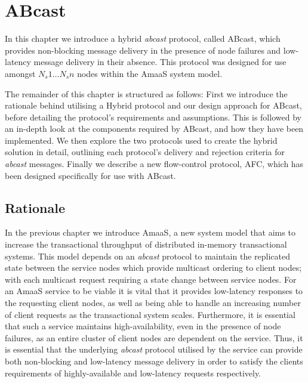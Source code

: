 \chapter{ABcast}\label{ch:abcast}

    \graphicspath{{Chapter4-ABcast/Figs/Vector/}{Chapter4-ABcast/Figs/}}

In this chapter we  introduce a hybrid \emph{abcast} protocol, called \textsf{ABcast}, which provides non-blocking message delivery in the presence of node failures and low-latency message delivery in their absence.  This protocol was designed for use amongst $N_s1 \ldots N_sn$ nodes within the \textsf{AmaaS} system model.  

The remainder of this chapter is structured as follows:  First we introduce the rationale behind utilising a Hybrid protocol and our design approach for \textsf{ABcast}, before detailing the protocol's requirements and assumptions.  This is followed by an in-depth look at the components required by \textsf{ABcast}, and how they have been implemented.  We then explore the two protocols used to create the hybrid solution in detail, outlining each protocol's delivery and rejection criteria for \emph{abcast} messages. Finally we describe a new flow-control protocol, AFC, which has been designed specifically for use with \textsf{ABcast}.  

\section{Rationale}
    In the previous chapter we introduce \textsf{AmaaS}, a new system model that aims to increase the transactional throughput of distributed in-memory transactional systems.  This model depends on an \emph{abcast} protocol to maintain the replicated state between the service nodes which provide multicast ordering to client nodes; with each multicast request requiring a state change between service nodes.  For an \textsf{AmaaS} service to be viable it is vital that it provides low-latency responses to the requesting client nodes, as well as being able to handle an increasing number of client requests as the transactional system scales.  Furthermore, it is essential that such a service maintains high-availability, even in the presence of node failures, as an entire cluster of client nodes are dependent on the service.  Thus, it is essential that the underlying \emph{abcast} protocol utilised by the service can provide both non-blocking and low-latency message delivery in order to satisfy the clients requirements of highly-available and low-latency requests respectively.  
    
